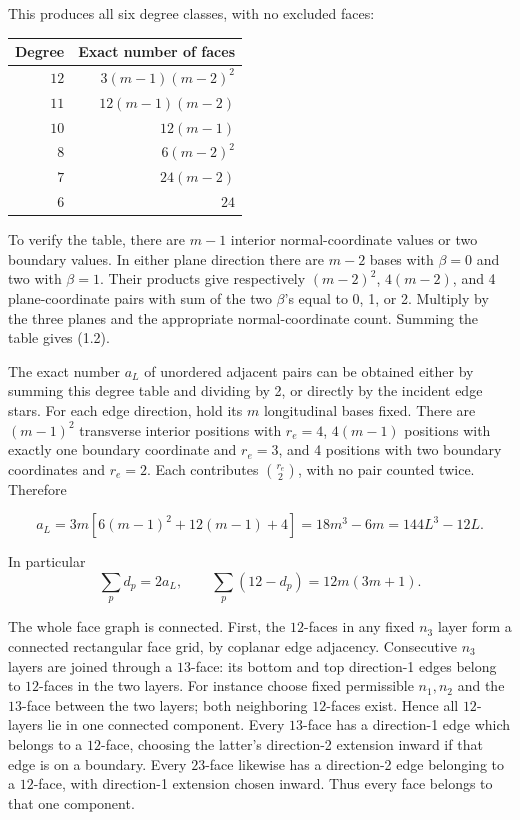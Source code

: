 \documentclass[
  11pt,
]{article}
\begin{document}
This produces all six degree classes, with no excluded faces:

{\def\LTcaptype{none} %
\begin{longtable}[]{@{}rr@{}}
\toprule\noalign{}
Degree & Exact number of faces \\
\midrule\noalign{}
\endhead
\bottomrule\noalign{}
\endlastfoot
\(12\) & \(3(m-1)(m-2)^2\) \\
\(11\) & \(12(m-1)(m-2)\) \\
\(10\) & \(12(m-1)\) \\
\(8\) & \(6(m-2)^2\) \\
\(7\) & \(24(m-2)\) \\
\(6\) & \(24\) \\
\end{longtable}
}

To verify the table, there are \(m-1\) interior normal-coordinate values
or two boundary values. In either plane direction there are \(m-2\)
bases with \(\beta=0\) and two with \(\beta=1\). Their products give
respectively \((m-2)^2\), \(4(m-2)\), and 4 plane-coordinate pairs with
sum of the two \(\beta\)'s equal to 0, 1, or 2. Multiply by the three
planes and the appropriate normal-coordinate count. Summing the table
gives (1.2).

The exact number \(a_L\) of unordered adjacent pairs can be obtained
either by summing this degree table and dividing by 2, or directly by
the incident edge stars. For each edge direction, hold its \(m\)
longitudinal bases fixed. There are \((m-1)^2\) transverse interior
positions with \(r_e=4\), \(4(m-1)\) positions with exactly one boundary
coordinate and \(r_e=3\), and 4 positions with two boundary coordinates
and \(r_e=2\). Each contributes \(\binom{r_e}{2}\), with no pair counted
twice. Therefore

\[
\boxed{a_L=3m[6(m-1)^2+12(m-1)+4]
=18m^3-6m=144L^3-12L.}
\tag{2.5}
\]

In particular \[
\sum_pd_p=2a_L,\qquad
\sum_p(12-d_p)=12m(3m+1).
\tag{2.6}
\]

The whole face graph is connected. First, the \(12\)-faces in any fixed
\(n_3\) layer form a connected rectangular face grid, by coplanar edge
adjacency. Consecutive \(n_3\) layers are joined through a \(13\)-face:
its bottom and top direction-1 edges belong to \(12\)-faces in the two
layers. For instance choose fixed permissible \(n_1,n_2\) and the
\(13\)-face between the two layers; both neighboring \(12\)-faces exist.
Hence all \(12\)-layers lie in one connected component. Every
\(13\)-face has a direction-1 edge which belongs to a \(12\)-face,
choosing the latter's direction-2 extension inward if that edge is on a
boundary. Every \(23\)-face likewise has a direction-2 edge belonging to
a \(12\)-face, with direction-1 extension chosen inward. Thus every face
belongs to that one component.
\end{document}
